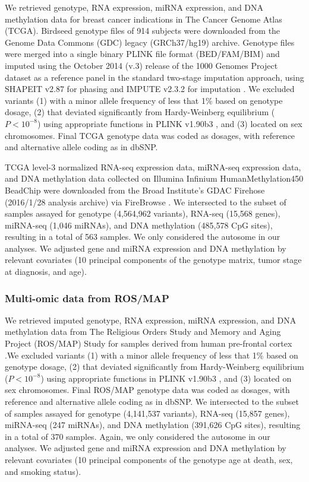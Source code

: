 We retrieved genotype, RNA expression,
miRNA expression, and DNA methylation data
for breast cancer indications in The Cancer Genome Atlas (TCGA).
Birdseed genotype files of 914 subjects were downloaded
from the Genome Data Commons (GDC)
legacy (GRCh37/hg19) archive. Genotype
files were merged into a single binary PLINK
file format (BED/FAM/BIM) and imputed
using the October 2014 (v.3) release of the 1000 Genomes
Project dataset as a reference panel in
the standard two-stage imputation approach,
using SHAPEIT v2.87 for phasing and IMPUTE
v2.3.2 for imputation
\cite{OConnell2014,Delaneau2012,Howie2009}.
We excluded variants (1) with a minor
allele frequency of less that 1\% based on
genotype
dosage, (2) that deviated significantly from
Hardy-Weinberg equilibrium ($P < 10^{-8}$)
using appropriate functions in PLINK v1.90b3
\cite{Wigginton2005,Purcell2007}, and
(3) located on sex chromosomes.  
Final TCGA genotype data was coded as dosages,
with reference and alternative allele coding as in
dbSNP.

TCGA level-3 normalized RNA-seq expression data,
miRNA-seq expression data, and DNA methylation
data collected on Illumina Infinium HumanMethylation450 BeadChip were downloaded
from the Broad Institute's GDAC Firehose (2016/1/28
analysis archive) via FireBrowse \cite{Weinstein2013TheProject}. We intersected to the subset
of samples assayed for
genotype (4,564,962 variants), 
RNA-seq (15,568 genes), 
miRNA-seq (1,046 miRNAs),
and DNA methylation (485,578 CpG sites), 
resulting in a total
of 563 samples. We only considered
the autosome in our analyses.
We adjusted gene and miRNA expression
and DNA methylation by relevant
covariates (10 principal 
components of the genotype 
matrix, tumor stage at diagnosis,
and age).

\subsubsection{Multi-omic data from ROS/MAP}

We retrieved imputed genotype, RNA expression,
miRNA expression, and DNA methylation data
from The Religious Orders Study and Memory and Aging Project (ROS/MAP) Study
for samples derived from human pre-frontal cortex
\cite{A.Bennett2013OverviewStudy,A.Bennett2013OverviewProject,DeJager2012ADecline,DeJager2018DataResearch}.We excluded variants (1) with a minor
allele frequency of less that 1\% based on
genotype
dosage, (2) that deviated significantly from
Hardy-Weinberg equilibrium ($P < 10^{-8}$)
using appropriate functions in PLINK v1.90b3
\cite{Wigginton2005,Purcell2007}, and
(3) located on sex chromosomes. 
Final ROS/MAP genotype data was coded as dosages,
with reference and alternative allele coding as in
dbSNP. We intersected to the subset
of samples assayed for 
genotype (4,141,537 variants), 
RNA-seq (15,857 genes), 
miRNA-seq (247 miRNAs),
and DNA methylation (391,626 CpG sites), resulting in a total
of 370 samples. Again, we only considered
the autosome in our analyses.
We adjusted gene and miRNA expression
and DNA methylation by relevant
covariates (10 principal 
components of the genotype 
age at death, sex, and smoking status).

